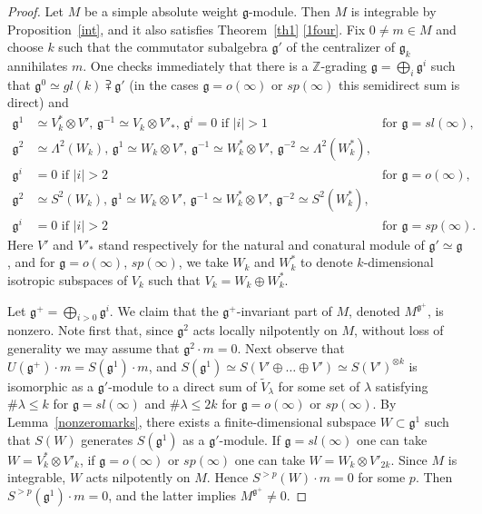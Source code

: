 \documentclass{amsart}
\renewcommand{\sl}{sl}
\newcommand{\so}{o}
\renewcommand{\sp}{sp}
\renewcommand{\gg}{\mathfrak{g}}
\theoremstyle{definition}
\numberwithin{equation}{section}
\begin{document}
\begin{proof}
Let $M$ be a simple absolute weight $\gg$-module.  Then $M$ is
integrable by Proposition~\ref{int}, and it also satisfies
Theorem~\ref{th1} \eqref{1four}. 
Fix $0\neq m\in M$ and choose $k$ such
that the commutator subalgebra $\gg'$ of the centralizer of $\gg_k$
annihilates $m$.  One checks immediately that there is a $\mathbb
Z$-grading $\gg=\bigoplus_i\gg^i$ such that 
$\gg^0 \simeq gl(k) \supsetplus \gg'$ (in the cases $\gg=\so(\infty)$ or
$\sp(\infty)$ this semidirect sum is direct) and 
\begin{align*}
\gg^1 & \simeq  V^*_k \otimes V' \textrm{, } \gg^{-1}\simeq V_k\otimes V'_* \textrm{, } 
\gg^i =0\text{ if } |i|>1 &\textrm{for }\gg=\sl(\infty),\\
\gg^{2} & \simeq\Lambda^2(W_k)\textrm{, } 
\gg^{1} \simeq W_k\otimes V' \textrm{, } 
\gg^{-1} \simeq W^*_k\otimes V' \textrm{, } 
\gg^{-2} \simeq \Lambda^2(W^*_k), & \\
\gg^i &=0 \text{ if } |i|>2 &\textrm{for }\gg=\so(\infty),\\
\gg^{2} & \simeq S^2(W_k) \textrm{, } 
\gg^{1} \simeq W_k\otimes V' \textrm{, } 
\gg^{-1}  \simeq W^*_k\otimes V' \textrm{, } 
\gg^{-2} \simeq S^2(W^*_k), & \\
\gg^i & =0 \textrm{ if } |i|>2 &\textrm{for } \gg=\sp(\infty).
\end{align*}
Here $V'$ and $V'_*$ stand respectively for the natural and conatural
module of $\gg' \simeq \gg$, and for $\gg = \so(\infty)$,
$\sp(\infty)$, we take $W_k$ and $W_k^*$ to denote $k$-dimensional isotropic subspaces of $V_k$ such that $V_k = W_k \oplus W_k^*$.

Let $\gg^+=\bigoplus_{i>0}\gg^i$. We claim that the $\gg^+$-invariant part of $M$, denoted $M^{\gg^+}$, is nonzero. 
Note first that, since $\gg^2$ acts locally nilpotently on $M$, without loss of generality we may assume that $\gg^2 \cdot m=0$.
Next observe that $U(\gg^+) \cdot m=S(\gg^1) \cdot m$, and
$S(\gg^1)\simeq S(V'\oplus\dots\oplus V') \simeq S(V')^{\otimes k}$ is isomorphic as a $\gg'$-module to a direct sum of
$\tilde V_{\lambda}$ for some set of $\lambda$ satisfying
$\#\lambda\leq k$ for $\gg=\sl(\infty)$ 
and $\# \lambda \leq 2k$ for $\gg=\so(\infty)$ or $\sp(\infty)$.
By Lemma~\ref{nonzeromarks}, there exists a finite-dimensional subspace $W\subset \gg^1$ such that
$S(W)$ generates $S(\gg^1)$ as a $\gg'$-module. 
If  $\gg=\sl(\infty)$ one can take $W= V^*_k\otimes V'_k$, if
$\gg=\so(\infty)$ or $\sp(\infty)$ one can take $W=W_k\otimes V'_{2k}$.
Since $M$ is
integrable, $W$ acts nilpotently on $M$. Hence $S^{>p }(W) \cdot m=0$ for some
$p$. Then  $S^{>p }(\gg^1) \cdot m=0$, and the latter implies $M^{\gg^+}\neq 0$.


\end{proof}
\end{document}
